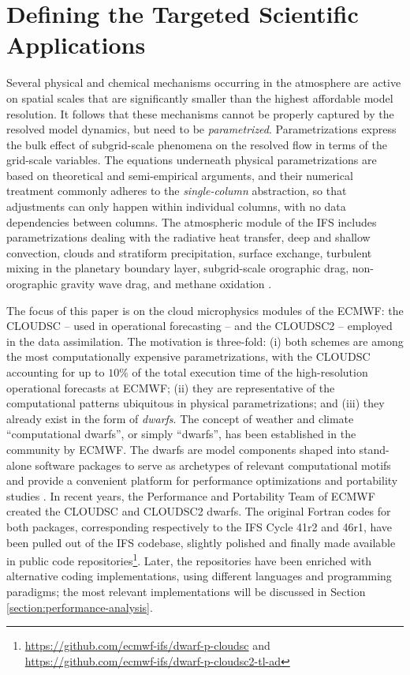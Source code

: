 \documentclass[../main.tex]{subfiles}
\begin{document}
    \justifying

    \section{Defining the Targeted Scientific Applications}
    \label{section:target-cloud-microphysics-schemes}

    Several physical and chemical mechanisms occurring in the atmosphere are active on spatial scales that are significantly smaller than the highest affordable model resolution. It follows that these mechanisms cannot be properly captured by the resolved model dynamics, but need to be \emph{parametrized}. Parametrizations express the bulk effect of subgrid-scale phenomena on the resolved flow in terms of the grid-scale variables. The equations underneath physical parametrizations are based on theoretical and semi-empirical arguments, and their numerical treatment commonly adheres to the \emph{single-column} abstraction, so that adjustments can only happen within individual columns, with no data dependencies between columns. The atmospheric module of the IFS includes parametrizations dealing with the radiative heat transfer, deep and shallow convection, clouds and stratiform precipitation, surface exchange, turbulent mixing in the planetary boundary layer, subgrid-scale orographic drag, non-orographic gravity wave drag, and methane oxidation \citep{ifs48r1}.

    The focus of this paper is on the cloud microphysics modules of the ECMWF: the CLOUDSC -- used in operational forecasting -- and the CLOUDSC2 -- employed in the data assimilation. The motivation is three-fold: (i) both schemes are among the most computationally expensive parametrizations, with the CLOUDSC accounting for up to $10\%$ of the total execution time of the high-resolution operational forecasts at ECMWF; (ii) they are representative of the computational patterns ubiquitous in physical parametrizations; and (iii) they already exist in the form of \emph{dwarfs}. The concept of weather and climate ``computational dwarfs'', or simply ``dwarfs'', has been established in the community by ECMWF. The dwarfs are model components shaped into stand-alone software packages to serve as archetypes of relevant computational motifs \citep{muller19} and provide a convenient platform for performance optimizations and portability studies \citep{bauer20}. In recent years, the Performance and Portability Team of ECMWF created the CLOUDSC and CLOUDSC2 dwarfs. The original Fortran codes for both packages, corresponding respectively to the IFS Cycle 41r2 and 46r1, have been pulled out of the IFS codebase, slightly polished and finally made available in public code repositories\footnote{\url{https://github.com/ecmwf-ifs/dwarf-p-cloudsc} and \url{https://github.com/ecmwf-ifs/dwarf-p-cloudsc2-tl-ad}}. Later, the repositories have been enriched with alternative coding implementations, using different languages and programming paradigms; the most relevant implementations will be discussed in Section \ref{section:performance-analysis}.
\end{document}
